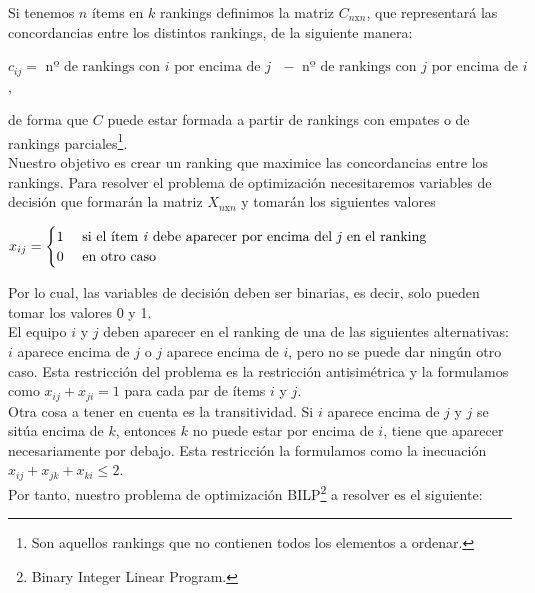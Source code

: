 Si tenemos $n$ ítems en $k$ rankings definimos la matriz $C_{n \text{x} n}$, que representará las concordancias entre los distintos rankings, de la siguiente manera:
\begin{center}
	$c_{ij} = \text{ nº de rankings con }i \text{ por encima de } j \text{ } -  \text{ nº de rankings con }j \text{ por encima de } i \text{ }$,
\end{center}

de forma que $C$ puede estar formada a partir de rankings con empates o de rankings parciales\footnote{Son aquellos rankings que no contienen todos los elementos a ordenar.}.\\

Nuestro objetivo es crear un ranking que maximice las concordancias entre los rankings. 
Para resolver el problema de optimización necesitaremos variables de decisión que formarán la matriz $X_{n \text{x} n}$ y tomarán los siguientes valores
\begin{center}
	$ x_{ij} =  \begin{cases}
1 & \text{ si el ítem \textit{i} debe aparecer por encima del \textit{j} en el ranking} \\
0 & \text{ en otro caso } 
\end{cases}$
\end{center}
Por lo cual, las variables de decisión deben ser binarias, es decir, solo pueden tomar los valores 0 y 1.\\

El equipo $i$ y $j$ deben aparecer en el ranking de una de las siguientes alternativas: $i$ aparece encima de $j$ o $j$ aparece encima de $i$, pero no se puede dar ningún otro caso. Esta restricción del problema es la restricción antisimétrica y la formulamos como $x_{ij} + x_{ji} = 1$ para cada par de ítems $i$ y $j$.\\

Otra cosa a tener en cuenta es la transitividad. Si $i$ aparece encima de $j$ y $j$ se sitúa encima de $k$, entonces $k$ no puede estar por encima de $i$, tiene que aparecer necesariamente por debajo. Esta restricción la formulamos como la inecuación $x_{ij} + x_{jk} + x_{ki} \leq 2$.\\


Por tanto, nuestro problema de optimización BILP\footnote{Binary Integer Linear Program.} a resolver es el siguiente:\\

